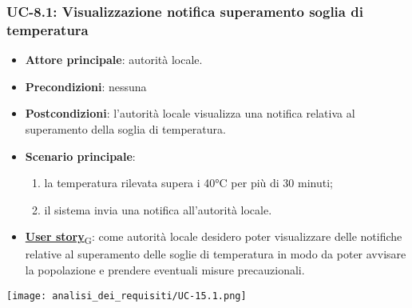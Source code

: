 \subsubsection{UC-8.1: Visualizzazione notifica superamento soglia di temperatura}
\begin{itemize}
	\item \textbf{Attore principale}: autorità locale.
	\item \textbf{Precondizioni}: nessuna
	\item \textbf{Postcondizioni}: l'autorità locale visualizza una notifica relativa al superamento della soglia di temperatura.
	\item \textbf{Scenario principale}:
	      \begin{enumerate}
		      \item la temperatura rilevata supera i 40°C per più di 30 minuti;
		      \item il sistema invia una notifica all'autorità locale.
	      \end{enumerate}
	\item \href{https://7last.github.io/docs/rtb/documentazione-interna/glossario\#user-story}{\textbf{User story}\textsubscript{G}}:
	      come autorità locale desidero poter visualizzare delle notifiche relative al superamento delle soglie di temperatura
	      in modo da poter avvisare la popolazione e prendere eventuali misure precauzionali.
\end{itemize}
\begin{center}
	\texttt{[image: analisi\_dei\_requisiti/UC-15.1.png]}
\end{center}

